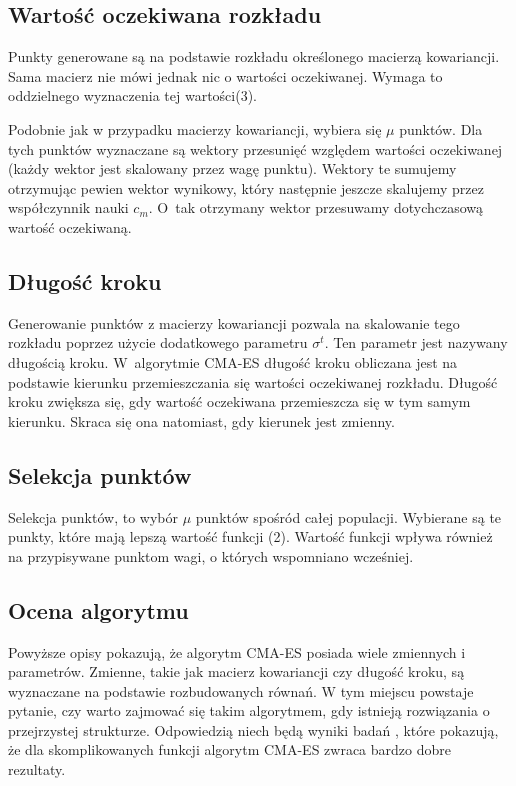 \documentclass{mini}
\begin{document}
\subsection{Wartość oczekiwana rozkładu} \label{wartoscoczekiwana}
\hspace{3,4ex}Punkty generowane są na podstawie rozkładu określonego macierzą kowariancji. Sama macierz nie mówi jednak nic o wartości oczekiwanej. Wymaga to oddzielnego wyznaczenia tej wartości(3).

Podobnie jak w przypadku macierzy kowariancji, wybiera się $\mu$ punktów. Dla tych punktów wyznaczane są wektory przesunięć względem wartości oczekiwanej (każdy wektor jest skalowany przez wagę punktu). Wektory te sumujemy otrzymując pewien wektor wynikowy, który następnie jeszcze skalujemy przez współczynnik nauki $c_m$. O~tak otrzymany wektor przesuwamy dotychczasową wartość oczekiwaną.

\subsection{Długość kroku}
\hspace{3,4ex}Generowanie punktów z macierzy kowariancji pozwala na skalowanie tego rozkładu poprzez użycie dodatkowego parametru $\sigma^t$. Ten parametr jest nazywany długością kroku. W~algorytmie CMA-ES długość kroku obliczana jest na podstawie kierunku przemieszczania się wartości oczekiwanej rozkładu. Długość kroku zwiększa się, gdy wartość oczekiwana przemieszcza się w tym samym kierunku. Skraca się ona natomiast, gdy kierunek jest zmienny.

\subsection{Selekcja punktów} \label{selekcjapunktow}
\hspace{3,4ex}Selekcja punktów, to wybór $\mu$ punktów spośród całej populacji. Wybierane są te punkty, które mają lepszą wartość funkcji (2). Wartość funkcji wpływa również na przypisywane punktom wagi, o których wspomniano wcześniej.

\subsection{Ocena algorytmu}
\hspace{3,4ex}Powyższe opisy pokazują, że algorytm CMA-ES posiada wiele zmiennych i parametrów. Zmienne, takie jak macierz kowariancji czy długość kroku, są wyznaczane na podstawie rozbudowanych równań. W tym miejscu powstaje pytanie, czy warto zajmować się takim algorytmem, gdy istnieją rozwiązania o przejrzystej strukturze. Odpowiedzią niech będą wyniki badań \cite{bbob}, które pokazują, że dla skomplikowanych funkcji algorytm CMA-ES zwraca bardzo dobre rezultaty.
\end{document}
